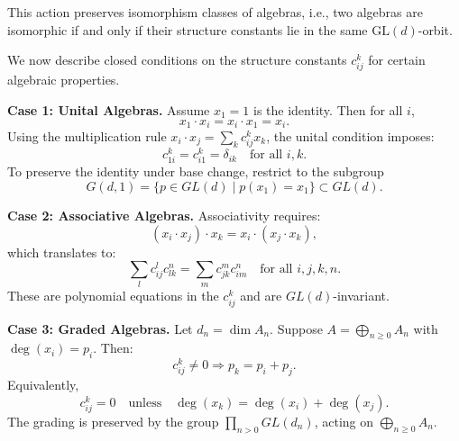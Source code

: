 \documentclass{amsart}
\begin{document}
This action preserves isomorphism classes of algebras, i.e., two algebras are isomorphic if and only if their structure constants lie in the same \( \mathrm{GL}(d) \)-orbit.



We now describe closed conditions on the structure constants \( c_{ij}^k \) for certain algebraic properties.

\textbf{Case 1: Unital Algebras.}
Assume \( x_1 = 1 \) is the identity. Then for all \( i \),
\[
x_1 \cdot x_i = x_i \cdot x_1 = x_i.
\]
Using the multiplication rule \( x_i \cdot x_j = \sum_k c_{ij}^k x_k \), the unital condition imposes:
\[
c_{1i}^k = c_{i1}^k = \delta_{ik} \quad \text{for all } i,k.
\]
To preserve the identity under base change, restrict to the subgroup
\[
G(d,1) = \{ p \in GL(d) \mid p(x_1) = x_1 \} \subset GL(d).
\]

\textbf{Case 2: Associative Algebras.}
Associativity requires:
\[
(x_i \cdot x_j) \cdot x_k = x_i \cdot (x_j \cdot x_k),
\]
which translates to:
\[
\sum_{l} c_{ij}^l c_{lk}^n = \sum_{m} c_{jk}^m c_{im}^n \quad \text{for all } i,j,k,n.
\]
These are polynomial equations in the \( c_{ij}^k \) and are \( GL(d) \)-invariant.

\textbf{Case 3: Graded Algebras.}
Let $d_n = \dim A_n$. Suppose \( A = \bigoplus_{n \geq 0} A_n \) with \( \deg(x_i) = p_i \). Then:
\[
c_{ij}^k \neq 0 \Rightarrow p_k = p_i + p_j.
\]
Equivalently,
\[
c_{ij}^k = 0 \quad \text{unless} \quad \deg(x_k) = \deg(x_i) + \deg(x_j).
\]
The grading is preserved by the group \( \prod_{n > 0} GL(d_n) \), acting on \( \bigoplus_{n \geq 0} A_n \).
\end{document}
